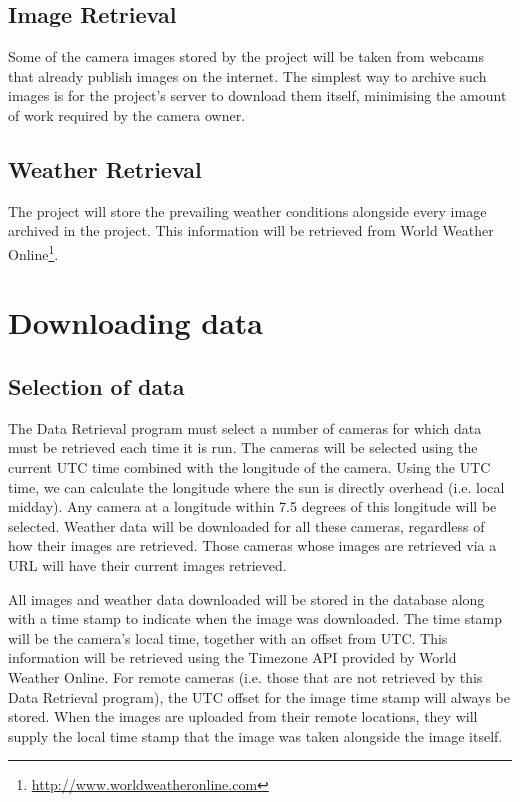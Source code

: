 \documentclass[11pt]{article}
\begin{document}
\subsection{Image Retrieval}
Some of the camera images stored by the project will be taken from webcams that already publish images on the internet. The simplest way to archive such images is for the project's server to download them itself, minimising the amount of work required by the camera owner.

\subsection{Weather Retrieval}
The project will store the prevailing weather conditions alongside every image archived in the project. This information will be retrieved from World Weather Online\footnote{\protect\url{http://www.worldweatheronline.com}}.

\section{Downloading data}
\subsection{Selection of data}
The Data Retrieval program must select a number of cameras for which data must be retrieved each time it is run. The cameras will be selected using the current UTC time combined with the longitude of the camera. Using the UTC time, we can calculate the longitude where the sun is directly overhead (i.e. local midday). Any camera at a longitude within 7.5 degrees of this longitude will be selected. Weather data will be downloaded for all these cameras, regardless of how their images are retrieved. Those cameras whose images are retrieved via a URL will have their current images retrieved.

All images and weather data downloaded will be stored in the database along with a time stamp to indicate when the image was downloaded. The time stamp will be the camera's local time, together with an offset from UTC. This information will be retrieved using the Timezone API provided by World Weather Online. For remote cameras (i.e. those that are not retrieved by this Data Retrieval program), the UTC offset for the image time stamp will always be stored. When the images are uploaded from their remote locations, they will supply the local time stamp that the image was taken alongside the image itself.
\end{document}
